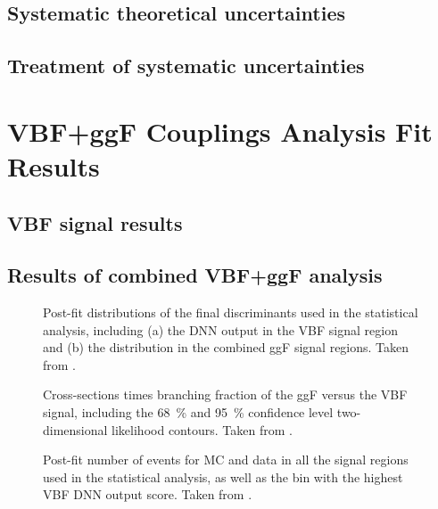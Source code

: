\subsection{Systematic theoretical uncertainties}
\subsection{Treatment of systematic uncertainties}

\section{\HWW VBF+ggF Couplings Analysis Fit Results}
\subsection{VBF signal results}

\subsection{Results of combined VBF+ggF analysis}

\begin{figure}
    \caption{Post-fit distributions of the final discriminants used in the statistical analysis, including (a) the DNN output in the VBF signal region and (b) the \mT distribution in the combined ggF signal regions. Taken from .}
    \label{fig:post-fit-final-discriminatns}
\end{figure}

\begin{figure}
    \caption{Cross-sections times branching fraction of the ggF versus the VBF signal, including the \SI{68}{\percent} and \SI{95}{\percent} confidence level two-dimensional likelihood contours. Taken from .}
    \label{fig:avocado-plot}
\end{figure}

\begin{figure}
    \caption{Post-fit number of events for MC and data in all the signal regions used in the statistical analysis, as well as the bin with the highest VBF DNN output score. Taken from .}
    \label{fig:post-fit-yields}
\end{figure}

